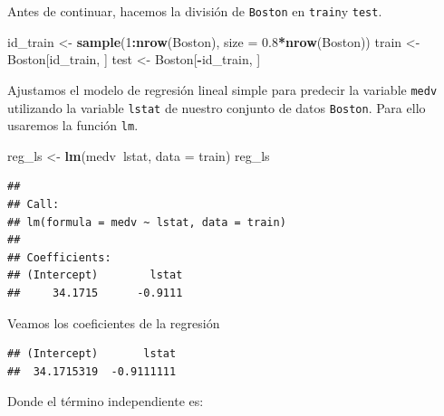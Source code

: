 \documentclass[]{book}
\newenvironment{Shaded}{\begin{snugshade}}{\end{snugshade}}
\newcommand{\DataTypeTok}[1]{\textcolor[rgb]{0.13,0.29,0.53}{#1}}
\newcommand{\DecValTok}[1]{\textcolor[rgb]{0.00,0.00,0.81}{#1}}
\newcommand{\FloatTok}[1]{\textcolor[rgb]{0.00,0.00,0.81}{#1}}
\newcommand{\KeywordTok}[1]{\textcolor[rgb]{0.13,0.29,0.53}{\textbf{#1}}}
\newcommand{\NormalTok}[1]{#1}
\newcommand{\OperatorTok}[1]{\textcolor[rgb]{0.81,0.36,0.00}{\textbf{#1}}}
\newcommand{\StringTok}[1]{\textcolor[rgb]{0.31,0.60,0.02}{#1}}
\begin{document}
Antes de continuar, hacemos la división de \texttt{Boston} en \texttt{train}y \texttt{test}.

\begin{Shaded}
\begin{Highlighting}[]
\NormalTok{id_train <-}\StringTok{ }\KeywordTok{sample}\NormalTok{(}\DecValTok{1}\OperatorTok{:}\KeywordTok{nrow}\NormalTok{(Boston), }\DataTypeTok{size =} \FloatTok{0.8}\OperatorTok{*}\KeywordTok{nrow}\NormalTok{(Boston))}
\NormalTok{train <-}\StringTok{ }\NormalTok{Boston[id_train, ]}
\NormalTok{test <-}\StringTok{ }\NormalTok{Boston[}\OperatorTok{-}\NormalTok{id_train, ]}
\end{Highlighting}
\end{Shaded}

Ajustamos el modelo de regresión lineal simple para predecir la variable \texttt{medv} utilizando la variable \texttt{lstat} de nuestro conjunto de datos \texttt{Boston}. Para ello usaremos la función \texttt{lm}.

\begin{Shaded}
\begin{Highlighting}[]
\NormalTok{reg_ls <-}\StringTok{ }\KeywordTok{lm}\NormalTok{(medv}\OperatorTok{~}\NormalTok{lstat, }\DataTypeTok{data =}\NormalTok{ train)}
\NormalTok{reg_ls}
\end{Highlighting}
\end{Shaded}

\begin{verbatim}
## 
## Call:
## lm(formula = medv ~ lstat, data = train)
## 
## Coefficients:
## (Intercept)        lstat  
##     34.1715      -0.9111
\end{verbatim}

Veamos los coeficientes de la regresión

\begin{Shaded}
\end{Shaded}

\begin{verbatim}
## (Intercept)       lstat 
##  34.1715319  -0.9111111
\end{verbatim}

Donde el término independiente es:

\begin{Shaded}
\end{Shaded}
\end{document}

